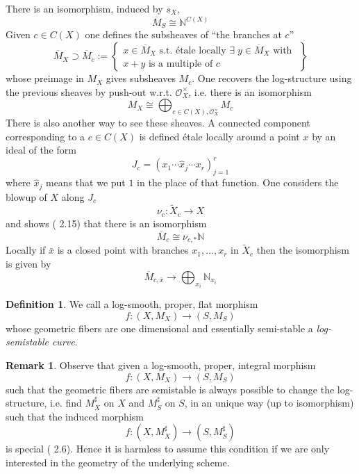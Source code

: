 \documentclass{amsart}
\theoremstyle{definition}
\newtheorem{definition}[thm]{Definition}
\newtheorem{rmk}[thm]{Remark}
\numberwithin{equation}{section}
\begin{document}
\noindent There is an isomorphism, induced by $s_X$,
$$
\overline{M}_S\cong{\mathbb{N}}^{C(X)}
$$
\noindent Given $c\in C(X)$ one defines the subsheaves of ``the branches at $c$''
$$
\overline{M}_X\supset\overline{M}_c:=\left\{
\begin{array}{c}
x\in \overline{M}_X \mbox{ s.t. \'etale locally }\exists \;y\in \overline{M}_X \mbox{ with }\\
x+y \mbox{ is a multiple of }c
\end{array}
\right\}
$$
\noindent whose preimage in $M_X$ gives subsheaves $M_c$. One recovers the log-structure using the previous sheaves by push-out w.r.t. ${\mathcal{O}}_{X}^{\times}$, i.e. there is an isomorphism
$$
M_X\cong \bigoplus_{c\in C(X), {\mathcal{O}}_X^{\times}} M_c
$$
\noindent There is also another way to see these sheaves. A connected component corresponding to a $c\in C(X)$ is defined \'etale locally around a point $x$ by an ideal of the form
$$
J_c=(x_1\cdots \hat{x}_j \cdots x_r)_{j=1}^r
$$
\noindent where $\hat{x}_j$ means that we put $1$ in the place of that function. One considers the blowup of $X$ along $J_c$ 
$$
\nu_c:\tilde{X}_c{\rightarrow} X
$$
\noindent and shows (\cite{olpic} 2.15) that there is an isomorphism 
$$
\overline{M}_{c}\cong \nu_{c,*}{\mathbb{N}}
$$
Locally if $\bar{x}$ is a closed point with branches $x_1,\dots,x_r$ in $\tilde{X}_c$ then the isomorphism is given by
$$
\overline{M}_{c,\bar{x}}{\rightarrow} \bigoplus_{x_i}{\mathbb{N}}_{x_i}
$$
\begin{definition}
We call a log-smooth, proper, flat morphism 
$$
f:(X,M_X){\rightarrow} (S,M_S)
$$
\noindent whose geometric fibers are one dimensional and essentially semi-stable a \emph{log-semistable curve}.
\end{definition}
\begin{rmk}\label{makespecial}
Observe that given a log-smooth, proper, integral morphism 
$$
f:(X,M_X){\rightarrow} (S,M_S)
$$
\noindent such that the geometric fibers are semistable is always possible to change the log-structure, i.e. find $M_X^{\sharp}$ on $X$ and $M_S^{\sharp}$ on $S$, in an unique way (up to isomorphism) such that the induced morphism 
$$
f:(X,M_X^{\sharp}){\rightarrow} (S,M_S^{\sharp})
$$
\noindent is special (\cite{olun} 2.6). Hence it is harmless to assume this condition if we are only interested in the geometry of the underlying scheme. 
\end{rmk}
\end{document}
